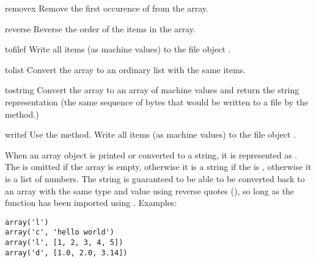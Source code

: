 \begin{methoddesc}[array]{remove}{x}
Remove the first occurence of  from the array.
\end{methoddesc}

\begin{methoddesc}[array]{reverse}{}
Reverse the order of the items in the array.
\end{methoddesc}

\begin{methoddesc}[array]{tofile}{f}
Write all items (as machine values) to the file object .
\end{methoddesc}

\begin{methoddesc}[array]{tolist}{}
Convert the array to an ordinary list with the same items.
\end{methoddesc}

\begin{methoddesc}[array]{tostring}{}
Convert the array to an array of machine values and return the
string representation (the same sequence of bytes that would
be written to a file by the  method.)
\end{methoddesc}

\begin{methoddesc}[array]{write}{f}
  {Use the  method.}
Write all items (as machine values) to the file object .
\end{methoddesc}

When an array object is printed or converted to a string, it is
represented as .  The
 is omitted if the array is empty, otherwise it is a
string if the  is , otherwise it is a list of
numbers.  The string is guaranteed to be able to be converted back to
an array with the same type and value using reverse quotes
(), so long as the  function has been
imported using .  Examples:

\begin{verbatim}
array('l')
array('c', 'hello world')
array('l', [1, 2, 3, 4, 5])
array('d', [1.0, 2.0, 3.14])
\end{verbatim}


\begin{seealso}
\end{seealso}
